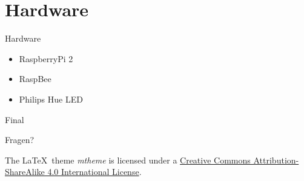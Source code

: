 \documentclass[10pt, compress]{beamer}
\begin{document}
\section{Hardware}

\begin{frame}{Hardware}
  \begin{itemize}
    \item RaspberryPi 2
	\item RaspBee
	\item Philips Hue LED
  \end{itemize}
\end{frame}

\begin{frame}{Final}

  \begin{center}\huge Fragen?\end{center}
    
  \vspace{1cm}
  \begin{center}
  {\small

  The \LaTeX \ theme \emph{mtheme} is licensed under a
  \href{http://creativecommons.org/licenses/by-sa/4.0/}{Creative Commons
  Attribution-ShareAlike 4.0 International License}.}

  \ccbysa
  
  \end{center}

\end{frame}
\end{document}
